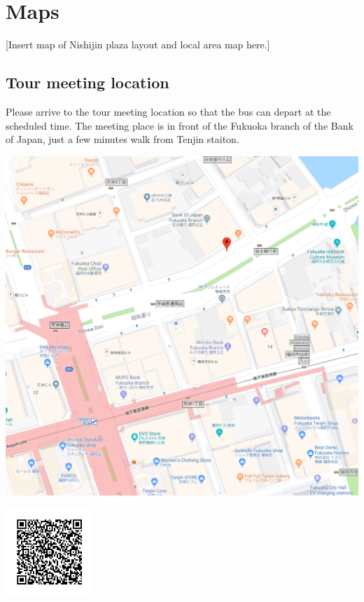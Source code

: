 \section{Maps}
[Insert map of Nishijin plaza layout and local area map here.]

\newpage
\subsection*{Tour meeting location}

Please arrive to the tour meeting location so that the bus can depart at the scheduled time.
The meeting place is in front of the Fukuoka branch of the Bank of Japan, just a few minutes walk from Tenjin staiton.

\noindent\includegraphics[width=\textwidth]{tour_meeting_place.png}

\includegraphics[width=0.25\textwidth]{tour_meeting_place_qrcode.png}
